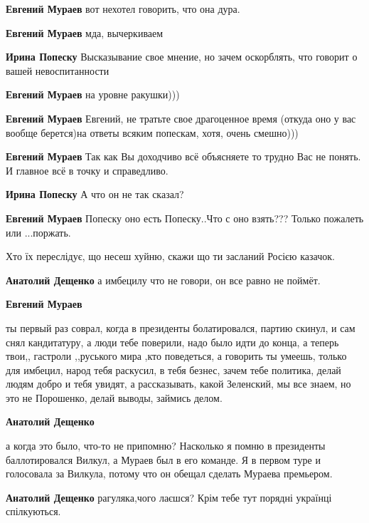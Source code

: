 \begin{itemize}
\begin{itemize}
\textbf{Евгений Мураев} вот нехотел говорить, что она дура.

\textbf{Евгений Мураев} мда, вычеркиваем

\textbf{Ирина Попеску} Высказывание свое мнение, но зачем оскорблять, что говорит о вашей невоспитанности

\textbf{Евгений Мураев} на уровне ракушки)))

\textbf{Евгений Мураев} Евгений, не тратьте свое драгоценное время (откуда оно у вас вообще берется)на ответы всяким попескам, хотя, очень смешно)))

\textbf{Евгений Мураев} Так как Вы доходчиво всё объясняете то трудно Вас не понять. И главное всё в точку и справедливо.

\textbf{Ирина Попеску} А что он не так сказал?

\textbf{Евгений Мураев} Попеску оно есть Попеску..Что с оно взять??? Только пожалеть или ...поржать.

\end{itemize} %


Хто їх переслідує, що несеш хуйню, скажи що ти засланий Росією казачок.

\begin{itemize} %
\textbf{Анатолий Дещенко} а имбецилу что не говори, он все равно не поймёт.

\textbf{Евгений Мураев} 

ты первый раз соврал, когда в президенты болатировался, партию скинул, и сам снял
кандитатуру, а люди тебе поверили, надо было идти до конца, а теперь твои,,
гастроли ,,руського мира ,кто поведеться, а говорить ты умеешь, только для
имбецил, народ тебя раскусил, в тебя безнес, зачем тебе политика, делай людям добро
и тебя увидят, а рассказывать, какой Зеленский, мы все знаем, но это не
Порошенко, делай выводы, займись делом.

\textbf{Анатолий Дещенко} 

а когда это было, что-то не припомню? Насколько я помню в президенты
баллотировался Вилкул, а Мураев был в его команде. Я в первом туре и голосовала
за Вилкула, потому что он обещал сделать Мураева премьером.

\textbf{Анатолий Дещенко} рагуляка,чого лаєшся?
Крім тебе тут порядні українці спілкуються.


\end{itemize}
\end{itemize}
